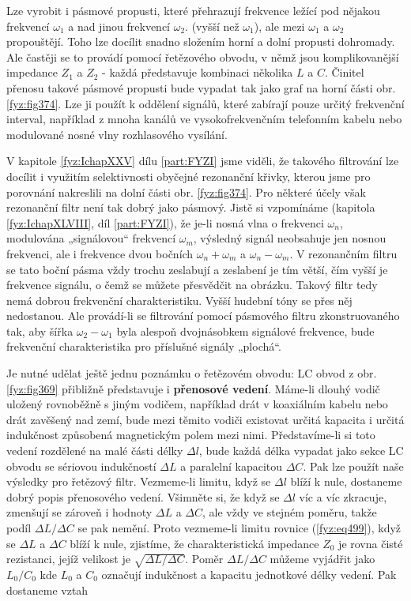   Lze vyrobit i pásmové propusti, které přehrazují frekvence ležící pod nějakou frekvencí 
  \(\omega_1\) a nad jinou frekvencí \(\omega_2\). (vyšší než \(\omega_1\)), ale mezi \(\omega_1\) 
  a \(\omega_2\) propouštějí. Toho lze docílit snadno složením horní a dolní propusti dohromady. 
  Ale častěji se to provádí pomocí řetězového obvodu, v němž jsou komplikovanější impedance \(Z_1\) 
  a \(Z_2\) - každá představuje kombinaci několika \(L\) a \(C\). Činitel přenosu takové pásmové 
  propusti bude vypadat tak jako graf na horní části obr. \ref{fyz:fig374}. Lze ji použít k 
  oddělení signálů, které zabírají pouze určitý frekvenční interval, například z mnoha kanálů ve 
  vysokofrekvenčním telefonním kabelu nebo modulované nosné vlny rozhlasového vysílání. 
  
  V kapitole \ref{fyz:IchapXXV} dílu \ref{part:FYZI} jsme viděli, že takového filtrování lze 
  docílit i využitím selektivnosti obyčejné rezonanční křivky, kterou jsme pro porovnání nakreslili 
  na dolní části obr. \ref{fyz:fig374}. Pro některé účely však rezonanční filtr není tak dobrý jako 
  pásmový. Jistě si vzpomínáme (kapitola \ref{fyz:IchapXLVIII}, díl \ref{part:FYZI}), že je-li 
  nosná vlna o frekvenci \(\omega_n\), modulována „signálovou“ frekvencí \(\omega_m\), výsledný 
  signál neobsahuje jen nosnou frekvenci, ale i frekvence dvou bočních \(\omega_n+\omega_m\) a 
  \(\omega_n-\omega_m\). V rezonančním filtru se tato boční pásma vždy trochu zeslabují a zeslabení 
  je tím větší, čím vyšší je frekvence signálu, o čemž se můžete přesvědčit na obrázku. Takový 
  filtr tedy nemá dobrou frekvenční charakteristiku. Vyšší hudební tóny se přes něj nedostanou. Ale 
  provádí-li se filtrování pomocí pásmového filtru zkonstruovaného tak, aby šířka 
  \(\omega_2-\omega_1\) byla alespoň dvojnásobkem signálové frekvence, bude frekvenční 
  charakteristika pro příslušné signály „plochá“. 
  
  Je nutné udělat ještě jednu poznámku o řetězovém obvodu: LC obvod z obr. \ref{fyz:fig369} 
  přibližně představuje i \textbf{přenosové vedení}. Máme-li dlouhý vodič uložený rovnoběžně s 
  jiným vodičem, například drát v koaxiálním kabelu nebo drát zavěšený nad zemí, bude mezi těmito 
  vodiči existovat určitá kapacita i určitá indukčnost způsobená magnetickým polem mezi nimi. 
  Představíme-li si toto vedení rozdělené na malé části délky \(\Delta l\), bude každá délka 
  vypadat jako sekce LC obvodu se sériovou indukčností \(\Delta L\) a paralelní kapacitou \(\Delta 
  C\). Pak lze použít naše výsledky pro řetězový filtr. Vezmeme-li limitu, když se \(\Delta l\) 
  blíží k nule, dostaneme dobrý popis přenosového vedení. Všimněte si, že když se \(\Delta l\) víc 
  a víc zkracuje, zmenšují se zároveň i hodnoty \(\Delta L\) a \(\Delta C\), ale vždy ve stejném 
  poměru, takže podíl \(\Delta L/\Delta C\) se pak nemění. Proto vezmeme-li limitu rovnice 
  (\ref{fyz:eq499}), když se \(\Delta L\) a \(\Delta C\) blíží k nule, zjistíme, že 
  charakteristická impedance \(Z_0\) je rovna čisté rezistanci, jejíž velikost je \(\sqrt{\Delta 
  L/\Delta C}\). Poměr \(\Delta L/\Delta C\) můžeme vyjádřit jako \(L_0/C_0\) kde \(L_0\) a \(C_0\) 
  označují indukčnost a kapacitu jednotkové délky vedení. Pak dostaneme vztah
  
